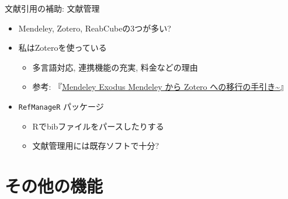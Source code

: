 \documentclass[
  12pt,
  ignorenonframetext,
]{beamer}
\providecommand{\tightlist}{%
  \setlength{\itemsep}{0pt}\setlength{\parskip}{0pt}}
\begin{document}
\begin{frame}[fragile]{文献引用の補助: 文献管理}
\protect\hypertarget{ux6587ux732eux5f15ux7528ux306eux88dcux52a9-ux6587ux732eux7ba1ux7406}{}

\begin{itemize}
\tightlist
\item
  Mendeley, Zotero, ReabCubeの3つが多い?
\item
  私はZoteroを使っている

  \begin{itemize}
  \tightlist
  \item
    多言語対応, 連携機能の充実, 料金などの理由
  \item
    参考:
    『\href{https://ill-identified.hatenablog.com/entry/2019/03/05/195257}{Mendeley
    Exodus Mendeley から Zotero への移行の手引き\textasciitilde{}}』
  \end{itemize}
\item
  \texttt{RefManageR} パッケージ

  \begin{itemize}
  \tightlist
  \item
    Rでbibファイルをパースしたりする
  \item
    文献管理用には既存ソフトで十分?
  \end{itemize}
\end{itemize}

\end{frame}

\hypertarget{ux305dux306eux4ed6ux306eux6a5fux80fd}{%
\section{その他の機能}\label{ux305dux306eux4ed6ux306eux6a5fux80fd}}
\end{document}
